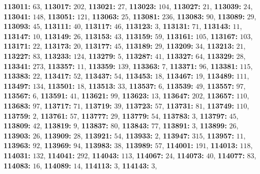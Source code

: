 \textsf{\bfseries 113011:} $63$, \textsf{\bfseries 113017:} $202$, \textsf{\bfseries 113021:} $27$, \textsf{\bfseries 113023:} $104$, \textsf{\bfseries 113027:} $21$, \textsf{\bfseries 113039:} $24$, \textsf{\bfseries 113041:} $148$, \textsf{\bfseries 113051:} $121$, \textsf{\bfseries 113063:} $25$, \textsf{\bfseries 113081:} $236$, \textsf{\bfseries 113083:} $90$, \textsf{\bfseries 113089:} $29$, \textsf{\bfseries 113093:} $45$, \textsf{\bfseries 113111:} $40$, \textsf{\bfseries 113117:} $46$, \textsf{\bfseries 113123:} $3$, \textsf{\bfseries 113131:} $71$, \textsf{\bfseries 113143:} $11$, \textsf{\bfseries 113147:} $10$, \textsf{\bfseries 113149:} $26$, \textsf{\bfseries 113153:} $43$, \textsf{\bfseries 113159:} $59$, \textsf{\bfseries 113161:} $105$, \textsf{\bfseries 113167:} $103$, \textsf{\bfseries 113171:} $22$, \textsf{\bfseries 113173:} $20$, \textsf{\bfseries 113177:} $45$, \textsf{\bfseries 113189:} $29$, \textsf{\bfseries 113209:} $34$, \textsf{\bfseries 113213:} $21$, \textsf{\bfseries 113227:} $83$, \textsf{\bfseries 113233:} $124$, \textsf{\bfseries 113279:} $5$, \textsf{\bfseries 113287:} $41$, \textsf{\bfseries 113327:} $64$, \textsf{\bfseries 113329:} $28$, \textsf{\bfseries 113341:} $273$, \textsf{\bfseries 113357:} $11$, \textsf{\bfseries 113359:} $139$, \textsf{\bfseries 113363:} $7$, \textsf{\bfseries 113371:} $96$, \textsf{\bfseries 113381:} $115$, \textsf{\bfseries 113383:} $22$, \textsf{\bfseries 113417:} $52$, \textsf{\bfseries 113437:} $54$, \textsf{\bfseries 113453:} $18$, \textsf{\bfseries 113467:} $19$, \textsf{\bfseries 113489:} $111$, \textsf{\bfseries 113497:} $134$, \textsf{\bfseries 113501:} $18$, \textsf{\bfseries 113513:} $33$, \textsf{\bfseries 113537:} $6$, \textsf{\bfseries 113539:} $49$, \textsf{\bfseries 113557:} $97$, \textsf{\bfseries 113567:} $6$, \textsf{\bfseries 113591:} $41$, \textsf{\bfseries 113621:} $99$, \textsf{\bfseries 113623:} $13$, \textsf{\bfseries 113647:} $202$, \textsf{\bfseries 113657:} $110$, \textsf{\bfseries 113683:} $97$, \textsf{\bfseries 113717:} $71$, \textsf{\bfseries 113719:} $39$, \textsf{\bfseries 113723:} $57$, \textsf{\bfseries 113731:} $81$, \textsf{\bfseries 113749:} $110$, \textsf{\bfseries 113759:} $2$, \textsf{\bfseries 113761:} $57$, \textsf{\bfseries 113777:} $29$, \textsf{\bfseries 113779:} $54$, \textsf{\bfseries 113783:} $3$, \textsf{\bfseries 113797:} $45$, \textsf{\bfseries 113809:} $42$, \textsf{\bfseries 113819:} $9$, \textsf{\bfseries 113837:} $80$, \textsf{\bfseries 113843:} $77$, \textsf{\bfseries 113891:} $3$, \textsf{\bfseries 113899:} $26$, \textsf{\bfseries 113903:} $26$, \textsf{\bfseries 113909:} $28$, \textsf{\bfseries 113921:} $54$, \textsf{\bfseries 113933:} $2$, \textsf{\bfseries 113947:} $315$, \textsf{\bfseries 113957:} $11$, \textsf{\bfseries 113963:} $92$, \textsf{\bfseries 113969:} $94$, \textsf{\bfseries 113983:} $38$, \textsf{\bfseries 113989:} $57$, \textsf{\bfseries 114001:} $191$, \textsf{\bfseries 114013:} $118$, \textsf{\bfseries 114031:} $132$, \textsf{\bfseries 114041:} $292$, \textsf{\bfseries 114043:} $113$, \textsf{\bfseries 114067:} $24$, \textsf{\bfseries 114073:} $40$, \textsf{\bfseries 114077:} $83$, \textsf{\bfseries 114083:} $16$, \textsf{\bfseries 114089:} $14$, \textsf{\bfseries 114113:} $3$, \textsf{\bfseries 114143:} $3$, 
